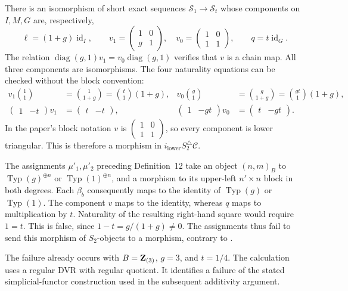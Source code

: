 There is an isomorphism of short exact sequences
$\mathcal S_1\to\mathcal S_t$ whose components on $I,M,G$ are,
respectively,
\[
\ell=(1+g)\operatorname{id}_I,\qquad
v_1=\begin{pmatrix}1&0\\g&1\end{pmatrix},\quad
v_0=\begin{pmatrix}1&0\\1&1\end{pmatrix},\qquad
q=t\operatorname{id}_G.
\]
The relation $\operatorname{diag}(g,1)v_1
=v_0\operatorname{diag}(g,1)$ verifies that $v$ is a chain map.
All three components are isomorphisms. The four naturality equations
can be checked without the block convention:
\begin{align*}
v_1\binom11&=\binom{1}{1+g}
             =\binom t1(1+g),&
v_0\binom g1&=\binom{g}{1+g}
             =\binom{gt}{1}(1+g),\\
\begin{pmatrix}1&-t\end{pmatrix}v_1
 &=\begin{pmatrix}t&-t\end{pmatrix},&
\begin{pmatrix}1&-gt\end{pmatrix}v_0
 &=\begin{pmatrix}t&-gt\end{pmatrix}.
\end{align*}
In the paper's block notation $v$ is
$\begin{pmatrix}1&0\\1&1\end{pmatrix}$, so every component is
lower triangular. This is therefore a morphism in
$i_{\mathrm{lower}}S_2^{\triangle}\mathcal C$.

The assignments $\mu'_1,\mu'_2$ preceding Definition~12 take an
object $(n,m)_B$ to $\operatorname{Typ}(g)^{\oplus n}$ or
$\operatorname{Typ}(1)^{\oplus n}$, and a morphism to its upper-left
$n'\times n$ block in both degrees. Each $\beta_b$ consequently
maps to the identity of $\operatorname{Typ}(g)$ or
$\operatorname{Typ}(1)$. The component $v$ maps to the identity,
whereas $q$ maps to multiplication by $t$. Naturality of the
resulting right-hand square would require $1=t$. This is false,
since $1-t=g/(1+g)\ne0$. The assignments thus fail to send this
morphism of $S_2$-objects to a morphism, contrary to
\cite[Lemma~13(III)]{MochizukiParameters}.

The failure already occurs with $B=\mathbf Z_{(3)}$, $g=3$, and $t=1/4$.
The calculation uses a regular DVR with regular quotient. It identifies
a failure of the stated simplicial-functor construction used in the
subsequent additivity argument.


